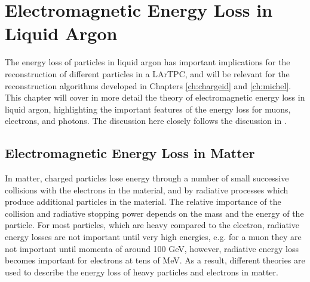 \chapter{\label{ch:energyloss}Electromagnetic Energy Loss in Liquid Argon} 

% 

\minitoc

The energy loss of particles in liquid argon has important implications for the
reconstruction of different particles in a LArTPC, and will be relevant for the
reconstruction algorithms developed in Chapters \ref{ch:chargeid} and 
\ref{ch:michel}. This chapter will cover in more detail the theory of 
electromagnetic energy loss in liquid argon, highlighting the important 
features of the energy loss for muons, electrons, and photons. The discussion 
here closely follows the discussion in \cite{PhysRevD.98.030001}.

\section{Electromagnetic Energy Loss in Matter}
In matter, charged particles lose energy through a number of small successive
collisions with the electrons in the material, and by radiative processes which
produce additional particles in the material. The relative importance of the
collision and radiative stopping power depends on the mass and the energy of the
particle. For most particles, which are heavy compared to the electron, 
radiative energy losses are not important until very high energies, e.g. for a 
muon they are not important until momenta of around 100 GeV, however, radiative 
energy loss becomes important for electrons at tens of 
MeV\cite{PhysRevD.98.030001}. As a result, different theories are used to 
describe the energy loss of heavy particles and electrons in matter.

